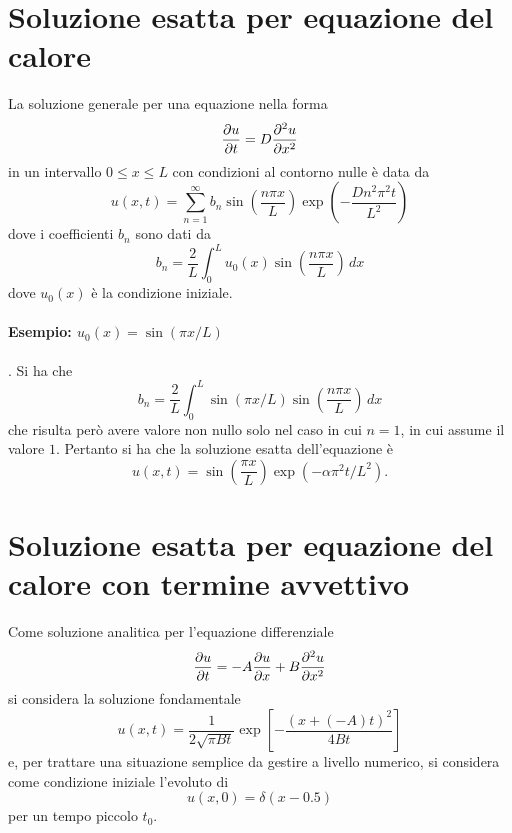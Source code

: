 \documentclass[10pt,a4paper]{article}
\begin{document}

\appendix

\section{Soluzione esatta per equazione del calore}
\label{app:soluzione_esatta}

La soluzione generale per una equazione nella forma
\begin{equation}
	\pdv{u}{t} = D \pdv[2]{u}{x}
\end{equation}
in un intervallo $0\leq x \leq L$ con condizioni al contorno nulle è data da
\begin{equation}
	u(x,t) = \sum_{n=1}^\infty b_n \sin\left(\frac{n\pi x}{L}\right) \exp\left(-\frac{D n^2 \pi^2 t}{L^2}\right)
\end{equation}
dove i coefficienti $b_n$ sono dati da
\begin{equation}
	b_n = \frac{2}{L}\int_0^L u_0(x)\sin\left(\frac{n\pi x}{L}\right)\,dx
\end{equation}
dove $u_0(x)$ è la condizione iniziale.

\paragraph{Esempio: $u_0(x) = \sin(\pi x / L)$}.
Si ha che
\begin{equation}
	b_n = \frac{2}{L}\int_0^L \sin(\pi x / L)\sin\left(\frac{n\pi x}{L}\right)\,dx
\end{equation}
che risulta però avere valore non nullo solo nel caso in cui $n=1$, in cui assume il valore $1$. Pertanto si ha che la soluzione esatta dell'equazione è
\begin{equation}
	u(x,t) = \sin\left(\frac{\pi x}{L}\right)\exp\left(-\alpha \pi^2 t / L^2 \right).
\end{equation}

\section{Soluzione esatta per equazione del calore con termine avvettivo}
\label{app:soluzione_fokker_planck}
Come soluzione analitica per l'equazione differenziale
\begin{equation}
	\pdv{u}{t} = -A\pdv{u}{x} + B\pdv[2]{u}{x}
\end{equation}
si considera la soluzione fondamentale
\begin{equation}
	u(x,t) = \frac{1}{2\sqrt{\pi B t}}\exp\left[-\frac{(x+(-A)t)^2}{4Bt}\right]
\end{equation}
e, per trattare una situazione semplice da gestire a livello numerico, si considera come condizione iniziale l'evoluto di
\begin{equation}
	u(x,0) = \delta(x-0.5)
\end{equation}
per un tempo piccolo $t_0$.
\end{document}
